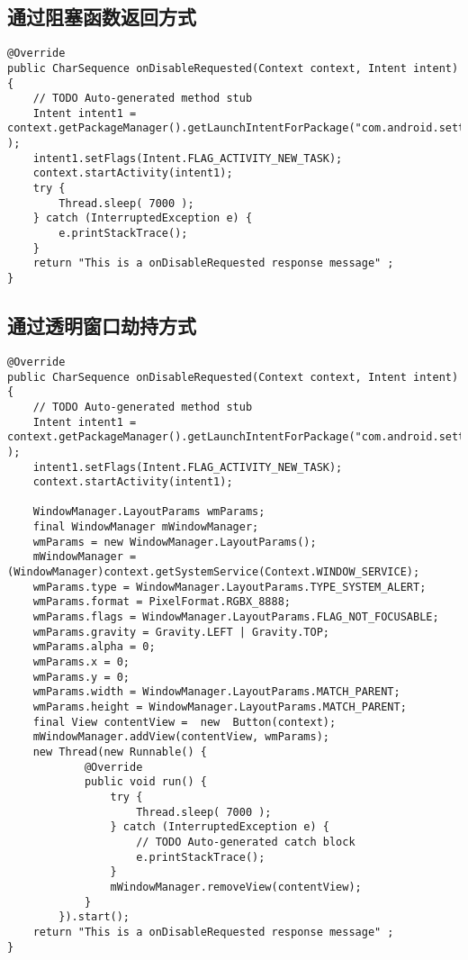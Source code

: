 \documentclass[9pt, b5paper]{article}
\begin{document}
\subsection{通过阻塞函数返回方式}
\label{sec-4-2}
\begin{verbatim}
@Override   
public CharSequence onDisableRequested(Context context, Intent intent) {  
    // TODO Auto-generated method stub   
    Intent intent1 = context.getPackageManager().getLaunchIntentForPackage("com.android.settings" );  
    intent1.setFlags(Intent.FLAG_ACTIVITY_NEW_TASK);  
    context.startActivity(intent1);  
    try {  
        Thread.sleep( 7000 );  
    } catch (InterruptedException e) {  
        e.printStackTrace();  
    }  
    return "This is a onDisableRequested response message" ;  
}
\end{verbatim}
\subsection{通过透明窗口劫持方式}
\label{sec-4-3}
\begin{verbatim}
@Override   
public CharSequence onDisableRequested(Context context, Intent intent) {  
    // TODO Auto-generated method stub   
    Intent intent1 = context.getPackageManager().getLaunchIntentForPackage("com.android.settings" );  
    intent1.setFlags(Intent.FLAG_ACTIVITY_NEW_TASK);  
    context.startActivity(intent1);
    
    WindowManager.LayoutParams wmParams;  
    final WindowManager mWindowManager;  
    wmParams = new WindowManager.LayoutParams();  
    mWindowManager = (WindowManager)context.getSystemService(Context.WINDOW_SERVICE);  
    wmParams.type = WindowManager.LayoutParams.TYPE_SYSTEM_ALERT;   
    wmParams.format = PixelFormat.RGBX_8888;   
    wmParams.flags = WindowManager.LayoutParams.FLAG_NOT_FOCUSABLE;        
    wmParams.gravity = Gravity.LEFT | Gravity.TOP;  
    wmParams.alpha = 0;  
    wmParams.x = 0;  
    wmParams.y = 0;  
    wmParams.width = WindowManager.LayoutParams.MATCH_PARENT;  
    wmParams.height = WindowManager.LayoutParams.MATCH_PARENT;  
    final View contentView =  new  Button(context);  
    mWindowManager.addView(contentView, wmParams);  
    new Thread(new Runnable() {            
            @Override   
            public void run() {  
                try {  
                    Thread.sleep( 7000 );  
                } catch (InterruptedException e) {  
                    // TODO Auto-generated catch block   
                    e.printStackTrace();  
                }  
                mWindowManager.removeView(contentView);  
            }  
        }).start();  
    return "This is a onDisableRequested response message" ;  
}
\end{verbatim}
\end{document}
